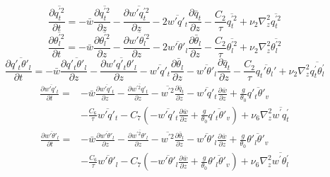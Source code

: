 \documentclass[11pt,fleqn]{article}
\newcommand{\ptlder}[2]{\frac{\partial #1}{\partial #2}}
\begin{document}
%
\begin{equation}
\label{eq_qtp2}
\ptlder{\overline{q_t^{'2}}}{t}
= - \bar{w}\ptlder{\overline{q^{'2}_t}}{z}	  
  - \ptlder{\overline{w'q_t^{'2}}}{z}
  - 2\overline{w'q'_t}\ptlder{\bar{q}_t}{z} 
  - \dfrac{C_2}{\tau} \overline{q_t^{'2}}
  + \nu_2 \nabla_z^2 \overline{q_t^{'2}}
\end{equation}
%
\begin{equation}
\label{eq_thlp2}
\ptlder{\overline{\theta_l^{'2}}}{t}
= - \bar{w}\ptlder{\overline{\theta^{'2}_l}}{z}	 
  - \ptlder{\overline{w'\theta_l^{'2}}}{z}
  - 2\overline{w'\theta'_l}\ptlder{\bar{\theta}_l}{z} 
  - \dfrac{C_2}{\tau} \overline{\theta_l^{'2}}
  + \nu_2 \nabla_z^2 \overline{\theta_l^{'2}}
\end{equation}
%
\begin{equation}
\label{eq_qtpthlp}
\ptlder{\overline{q'_t\theta'_l}}{t}
= - \bar{w}\ptlder{\overline{q'_t\theta'_l}}{z}	 
  - \ptlder{\overline{w'q'_t\theta'_l}}{z}
  - \overline{w'q'_t}\ptlder{\bar{\theta}_l}{z} 
  - \overline{w'\theta'_l}\ptlder{\bar{q}_t}{z}
  - \dfrac{C_2}{\tau} \overline{q_t' \theta_l'}
  + \nu_2 \nabla_z^2 \overline{q_t^{'}\theta_l^{'}}
\end{equation}
%
\begin{equation}
\label{eq_wpqtp}
\begin{split}
\ptlder{\overline{w'q'_t}}{t} 
= & - \bar{w}\ptlder{\overline{w'q'_t}}{z}	 		
    - \ptlder{\overline{w^{'2}q'_t}}{z}
    - \overline{w^{'2}}\ptlder{\bar{q}_t}{z} 
    - \overline{w'q'_t}\ptlder{\bar{w}}{z}
    + \frac{g}{\theta_0} \overline{q'_t\theta'_v} \\
  & - \frac{C_6}{\tau}\overline{w'q'_t}
    - C_7 \left(
             - \overline{w'q'_t}\ptlder{\bar{w}}{z}
             + \frac{g}{\theta_0} \overline{q'_t\theta'_v}
          \right) 
    + \nu_6 \nabla_z^2 \overline{w^{'}q_t^{'}}
\end{split}
\end{equation}
%
\begin{equation}
\label{eq_wpthlp}
\begin{split}
\ptlder{\overline{w'\theta'_l}}{t}
= & - \bar{w}\ptlder{\overline{w'\theta'_l}}{z}	 
    - \ptlder{\overline{w^{'2}\theta'_l}}{z}
    - \overline{w^{'2}}\ptlder{\bar{\theta}_l}{z} 
    - \overline{w'\theta'_l}\ptlder{\bar{w}}{z}
    + \frac{g}{\theta_0} \overline{\theta'_l\theta'_v} \\
  & - \frac{C_6}{\tau}\overline{w'\theta'_l}
    - C_7 \left( 
             - \overline{w'\theta'_l}\ptlder{\bar{w}}{z}
             + \frac{g}{\theta_0} \overline{\theta'_l\theta'_v}
          \right)
    + \nu_6 \nabla_z^2 \overline{w^{'}\theta_l^{'}}
\end{split}
\end{equation}
\end{document}
